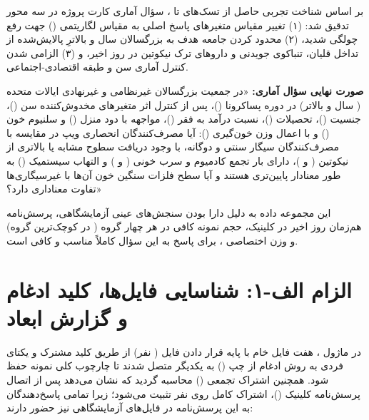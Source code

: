 \documentclass[12pt]{exam}
\begin{document}
بر اساس شناخت تجربی حاصل از تسک‌های  تا ، سؤال آماری کارت پروژه در سه محور تدقیق شد: (۱) تغییر مقیاس متغیرهای پاسخ اصلی به مقیاس لگاریتمی () جهت رفع چولگی شدید، (۲) محدود کردن جامعه هدف به بزرگسالان  سال و بالاترِ پالایش‌شده از تداخل قلیان، تنباکوی جویدنی و داروهای ترک نیکوتین در  روز اخیر، و (۳) الزامی شدن کنترل آماری سن و طبقه اقتصادی-اجتماعی.

\textbf{صورت نهایی سؤال آماری:} «در جمعیت بزرگسالان غیرنظامی و غیرنهادی ایالات متحده ( سال و بالاتر) در دوره پساکرونا ()، پس از کنترل اثر متغیرهای مخدوش‌کننده سن ()، جنسیت ()، تحصیلات ()، نسبت درآمد به فقر ()، مواجهه با دود منزل () و سلنیوم خون () و با اعمال وزن خون‌گیری (): آیا مصرف‌کنندگان انحصاری ویپ در مقایسه با مصرف‌کنندگان سیگار سنتی و دوگانه، با وجود دریافت سطوح مشابه یا بالاتری از نیکوتین ( و )، دارای بار تجمع کادمیوم و سرب خونی ( و ) و التهاب سیستمیک () به طور معنادار پایین‌تری هستند و آیا سطح فلزات سنگین خون آن‌ها با غیرسیگاری‌ها تفاوت معناداری دارد؟»

این مجموعه داده به دلیل دارا بودن سنجش‌های عینی آزمایشگاهی، پرسش‌نامه هم‌زمان  روز اخیر در کلینیک، حجم نمونه کافی در هر چهار گروه ( در کوچک‌ترین گروه) و وزن اختصاصی ، برای پاسخ به این سؤال کاملاً مناسب و کافی است.


\section{الزام الف-۱: شناسایی فایل‌ها، کلید ادغام و گزارش ابعاد}

در ماژول ، هفت فایل خام با پایه قرار دادن فایل  ( نفر) از طریق کلید مشترک و یکتای فردی  به روش ادغام از چپ () به یکدیگر متصل شدند تا چارچوب کلی نمونه حفظ شود. همچنین اشتراک تجمعی () محاسبه گردید که نشان می‌دهد پس از اتصال پرسش‌نامه کلینیک ()، اشتراک کامل روی  نفر تثبیت می‌شود؛ زیرا تمامی پاسخ‌دهندگان به این پرسش‌نامه در فایل‌های آزمایشگاهی نیز حضور دارند:
\end{document}
